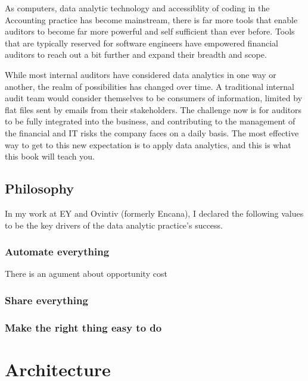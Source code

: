 \documentclass[
]{book}
\begin{document}
As computers, data analytic technology and accessiblity of coding in the Accounting practice has become mainstream, there is far more tools that enable auditors to become far more powerful and self sufficient than ever before. Tools that are typically reserved for software engineers have empowered financial auditors to reach out a bit further and expand their breadth and scope.

While most internal auditors have considered data analytics in one way or another, the realm of possibilities has changed over time. A traditional internal audit team would consider themselves to be consumers of information, limited by flat files sent by emails from their stakeholders. The challenge now is for auditors to be fully integrated into the business, and contributing to the management of the financial and IT risks the company faces on a daily basis. The most effective way to get to this new expectation is to apply data analytics, and this is what this book will teach you.

\hypertarget{philosophy}{%
\section{Philosophy}\label{philosophy}}

In my work at EY and Ovintiv (formerly Encana), I declared the following values to be the key drivers of the data analytic practice's success.

\hypertarget{automate-everything}{%
\subsection{Automate everything}\label{automate-everything}}

There is an agument about opportunity cost

\hypertarget{share-everything}{%
\subsection{Share everything}\label{share-everything}}

\hypertarget{make-the-right-thing-easy-to-do}{%
\subsection{Make the right thing easy to do}\label{make-the-right-thing-easy-to-do}}

\hypertarget{architecture}{%
\chapter{Architecture}\label{architecture}}
\end{document}
